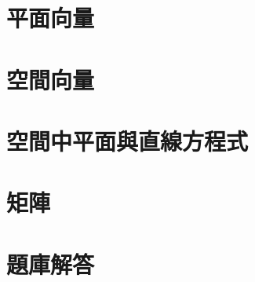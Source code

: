 \documentclass[a4paper,12pt]{report}
\begin{document}
\chapter{平面向量}


\chapter{空間向量}


\chapter{空間中平面與直線方程式}


\chapter{矩陣}


\chapter{題庫解答}

\end{document}
